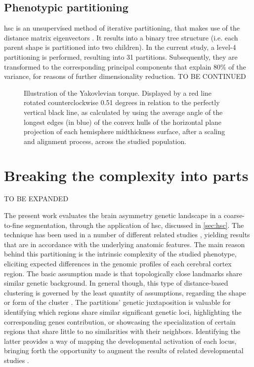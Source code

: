 \subsection{Phenotypic partitioning}\label{sec:hsc}
\Acf{hsc} is an unsupervised method of iterative partitioning, that makes use of the distance matrix eigenvectors \cite{Ng2002}. It results into a binary tree structure (i.e. each parent shape is partitioned into two children). In the current study, a level-4 partitioning is performed, resulting into 31 partitions. Subsequently, they are transformed to the corresponding principal components that explain 80\% of the variance, for reasons of further dimensionality reduction. TO BE CONTINUED


\begin{figure}
	\centering
	
	\caption[Yakovlevian torque]{Illustration of the Yakovlevian torque. Displayed by a red line rotated counterclockwise 0.51 degrees in relation to the perfectly vertical black line, as calculated by using the average angle of the longest edges (in blue) of the convex hulls of the horizontal plane projection of each hemisphere midthickness surface, after a scaling and alignment process, across the studied population.}
	\label{fig:yaktorque}
\end{figure}

\section{Breaking the complexity into parts}
TO BE EXPANDED

The present work evaluates the brain asymmetry genetic landscape in a coarse-to-fine segmentation, through the application of \ac{hsc}\cite{Ng2002}, discussed in \autoref{sec:hsc}. The technique has been used in a number of different related studies \cite{Claes2018}\cite{Naqvi2021}, yielding results that are in accordance with the underlying anatomic features. The main reason behind this partitioning is the intrinsic complexity of the studied phenotype, eliciting expected differences in the genomic profiles of each cerebral cortex region. The basic assumption made is that topologically close landmarks share similar genetic background. In general though, this type of distance-based clustering is governed by the least quantity of assumptions, regarding the shape or form of the cluster \cite{VonLuxburg2007}. The partitions' genetic juxtaposition is valuable for identifying which regions share similar significant genetic loci, highlighting the corresponding genes contribution, or showcasing the specialization of certain regions that share little to no similarities with their neighbors. Identifying the latter provides a way of mapping the developmental activation of each locus, bringing forth the opportunity to augment the results of related developmental studies \cite{Vijayakumar2016}.

